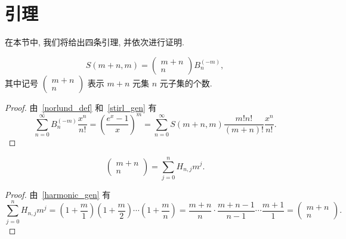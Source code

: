 \documentclass{CombPaper}
\begin{document}

\section{引理}\label{sec2}
在本节中, 我们将给出四条引理, 并依次进行证明.
\begin{lemma}\label{lemma1}
$$S(m+n,  m)=\left(\begin{array}{c}m+n \\ n\end{array}\right) B_{n}^{(-m)}, $$ 其中记号 $\left(\begin{array}{c}m+n \\ n\end{array}\right)$ 表示 $m+n$ 元集 $n$ 元子集的个数.
\end{lemma}
\begin{proof}
由~\eqref{norlund_def} 和~\eqref{stirl_gen} 有 $$
\sum_{n=0}^{\infty} B_{n}^{(-m)} \frac{x^{n}}{n !}=\left(\frac{e^{x}-1}{x}\right)^{m}=\sum_{n=0}^{\infty} S(m+n,  m) \frac{m ! n !}{(m+n) !} \frac{x^{n}}{n !}.
$$
\end{proof}
\begin{lemma}\label{lemma2}
$$\left(\begin{array}{c}m+n \\ n\end{array}\right)=\sum_{j=0}^{n} H_{n,  j} m^{j}.$$
\end{lemma}
\begin{proof}
由~\eqref{harmonic_gen} 有
$$
\sum_{j=0}^{n} H_{n,  j} m^{j}=\left(1+\frac{m}{1}\right)\left(1+\frac{m}{2}\right) \cdots\left(1+\frac{m}{n}\right)=\frac{m+n}{n} \cdot \frac{m+n-1}{n-1} \cdots \frac{m+1}{1}=\left(\begin{array}{c}
m+n \\
n
\end{array}\right).
$$
\end{proof}
\end{document}
